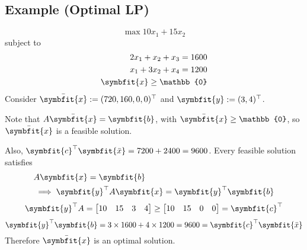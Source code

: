 \subsection{Example (Optimal LP)}
\[\max 10x_1+15x_2\]
subject to
\begin{align*}
    2x_1+x_2+x_3=1600\\
    x_1+3x_2+x_4=1200\\
    \symbfit{x}\ge \mathbb{0}
\end{align*}
Consider $\bar{\symbfit{x}}:=(720,160,0,0)^\top$ and $\symbfit{y}:=(3,4)^\top$.

Note that
$A\bar{\symbfit{x}}=\symbfit{b}$, with $\bar{\symbfit{x}}\ge \mathbb{0}$, 
so $\bar{\symbfit{x}}$ is a feasible solution.


Also, $\symbfit{c}^\top \symbfit{\bar{x}}=7200+2400=9600$.
Every feasible solution satisfies
\begin{align*}
    &A\symbfit{x}=\symbfit{b}\\
    &\implies \symbfit{y}^\top A\symbfit{x}=\symbfit{y}^\top \symbfit{b}
\end{align*}
\[\symbfit{y}^\top A=
\begin{bmatrix}
    10 & 15 & 3 & 4
\end{bmatrix}
\ge
\begin{bmatrix}
    10 & 15 & 0 & 0
\end{bmatrix}=\symbfit{c}^\top \]
\[\symbfit{y}^\top \symbfit{b}
=3\times 1600+4\times 1200=9600
=\symbfit{c}^\top \symbfit{\bar{x}}\]
Therefore $\bar{\symbfit{x}}$ is an optimal solution.
